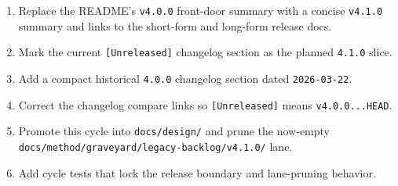 \begin{enumerate}
\def\labelenumi{\arabic{enumi}.}
\tightlist
\item
  Replace the README's \texttt{v\allowbreak{}4\allowbreak{}.\allowbreak{}0\allowbreak{}.\allowbreak{}0} front-door summary with a concise \texttt{v\allowbreak{}4\allowbreak{}.\allowbreak{}1\allowbreak{}.\allowbreak{}0} summary and links to the short-form and long-form release docs.
\item
  Mark the current \texttt{[\allowbreak{}U\allowbreak{}n\allowbreak{}r\allowbreak{}e\allowbreak{}l\allowbreak{}e\allowbreak{}a\allowbreak{}s\allowbreak{}e\allowbreak{}d\allowbreak{}]} changelog section as the planned \texttt{4\allowbreak{}.\allowbreak{}1\allowbreak{}.\allowbreak{}0} slice.
\item
  Add a compact historical \texttt{4\allowbreak{}.\allowbreak{}0\allowbreak{}.\allowbreak{}0} changelog section dated \texttt{2\allowbreak{}0\allowbreak{}2\allowbreak{}6\allowbreak{}-\allowbreak{}0\allowbreak{}3\allowbreak{}-\allowbreak{}2\allowbreak{}2}.
\item
  Correct the changelog compare links so \texttt{[\allowbreak{}U\allowbreak{}n\allowbreak{}r\allowbreak{}e\allowbreak{}l\allowbreak{}e\allowbreak{}a\allowbreak{}s\allowbreak{}e\allowbreak{}d\allowbreak{}]} means \texttt{v\allowbreak{}4\allowbreak{}.\allowbreak{}0\allowbreak{}.\allowbreak{}0\allowbreak{}.\allowbreak{}.\allowbreak{}.\allowbreak{}H\allowbreak{}E\allowbreak{}A\allowbreak{}D}.
\item
  Promote this cycle into \texttt{d\allowbreak{}o\allowbreak{}c\allowbreak{}s\allowbreak{}/\allowbreak{}d\allowbreak{}e\allowbreak{}s\allowbreak{}i\allowbreak{}g\allowbreak{}n\allowbreak{}/} and prune the now-empty \texttt{d\allowbreak{}o\allowbreak{}c\allowbreak{}s\allowbreak{}/\allowbreak{}m\allowbreak{}e\allowbreak{}t\allowbreak{}h\allowbreak{}o\allowbreak{}d\allowbreak{}/\allowbreak{}g\allowbreak{}r\allowbreak{}a\allowbreak{}v\allowbreak{}e\allowbreak{}y\allowbreak{}a\allowbreak{}r\allowbreak{}d\allowbreak{}/\allowbreak{}l\allowbreak{}e\allowbreak{}g\allowbreak{}a\allowbreak{}c\allowbreak{}y\allowbreak{}-\allowbreak{}b\allowbreak{}a\allowbreak{}c\allowbreak{}k\allowbreak{}l\allowbreak{}o\allowbreak{}g\allowbreak{}/\allowbreak{}v\allowbreak{}4\allowbreak{}.\allowbreak{}1\allowbreak{}.\allowbreak{}0\allowbreak{}/} lane.
\item
  Add cycle tests that lock the release boundary and lane-pruning behavior.
\end{enumerate}

